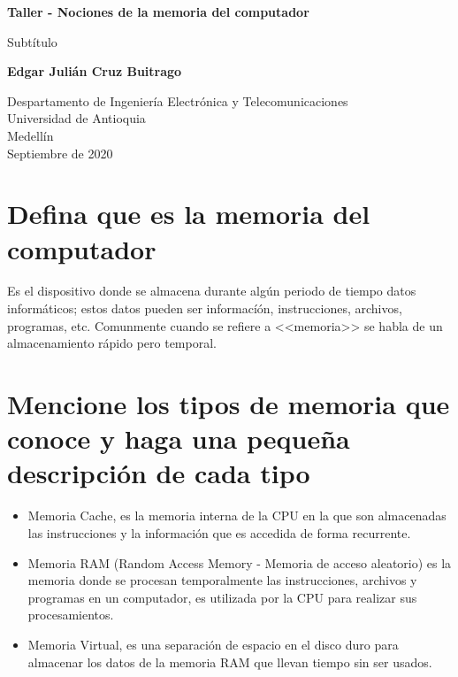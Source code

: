 \documentclass{article}
\begin{document}
\begin{titlepage}
    \begin{center}
        \vspace*{1cm}
            
        \Huge
        \textbf{Taller - Nociones de la memoria del computador}
            
        \vspace{0.5cm}
        \LARGE
        Subtítulo
            
        \vspace{1.5cm}
            
        \textbf{Edgar Julián Cruz Buitrago}
            
        \vfill
            
        \vspace{0.8cm}
            
        \Large
        Despartamento de Ingeniería Electrónica y Telecomunicaciones\\
        Universidad de Antioquia\\
        Medellín\\
        Septiembre de 2020
            
    \end{center}
\end{titlepage}

\tableofcontents

\section{Defina que es la memoria del computador}
Es el dispositivo donde se almacena durante algún periodo de tiempo datos informáticos; estos datos pueden ser informacíón, instrucciones, archivos, programas, etc.
Comunmente cuando se refiere a <<memoria>> se habla de un almacenamiento rápido pero temporal. \cite{augusto}

\section{Mencione los tipos de memoria que conoce y haga una pequeña descripción de cada tipo} 
\begin{itemize}
    \item Memoria Cache, es la memoria interna de la CPU en la que son almacenadas las instrucciones y la información que es accedida de forma recurrente.
    \item Memoria RAM (Random Access Memory - Memoria de acceso aleatorio) es la memoria donde se procesan temporalmente las instrucciones, archivos y programas en un computador, es utilizada por la CPU para realizar sus procesamientos.
    \item Memoria Virtual, es una separación de espacio en el disco duro para almacenar los datos de la memoria RAM que llevan tiempo sin ser usados.\cite{augusto}
\end{itemize}
\end{document}
